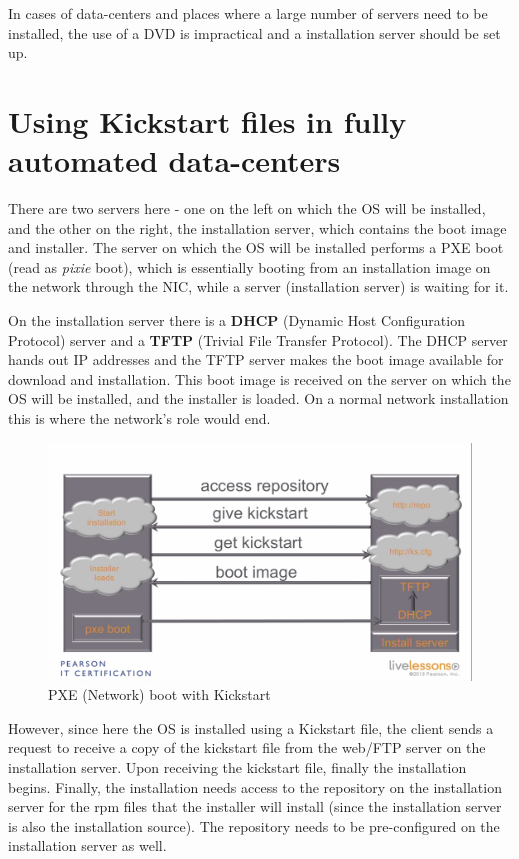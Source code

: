 In cases of data-centers and places where a large number of servers need to be installed, the use of a DVD is impractical and a installation server should be set up. 

	\section{Using Kickstart files in fully automated data-centers}
There are two servers here - one on the left on which the OS will be installed, and the other on the right, the installation server, which contains the boot image and installer. The server on which the OS will be installed performs a PXE boot (read as \textit{pixie} boot), which is essentially booting from an installation image on the network through the NIC, while a server (installation server) is waiting for it. 

On the installation server there is a \textbf{DHCP} (Dynamic Host Configuration Protocol) server and a \textbf{TFTP} (Trivial File Transfer Protocol). The DHCP server hands out IP addresses and the TFTP server makes the boot image available for download and installation. This boot image is received on the server on which the OS will be installed, and the installer is loaded. On a normal network installation this is where the network's role would end.

\begin{figure}[H]
	\centering
	\includegraphics[width=0.9\linewidth]{RHCSA/Mod3/chapters/3.18.a}
	\caption{PXE (Network) boot with Kickstart}
	\label{fig:3 Network boot with Kickstart}
\end{figure}

\noindent
However, since here the OS is installed using a Kickstart file, the client sends a request to receive a copy of the kickstart file from the web/FTP server on the installation server. Upon receiving the kickstart file, finally the installation begins. Finally, the installation needs access to the repository on the installation server for the rpm files that the installer will install (since the installation server is also the installation source). The repository needs to be pre-configured on the installation server as well. 